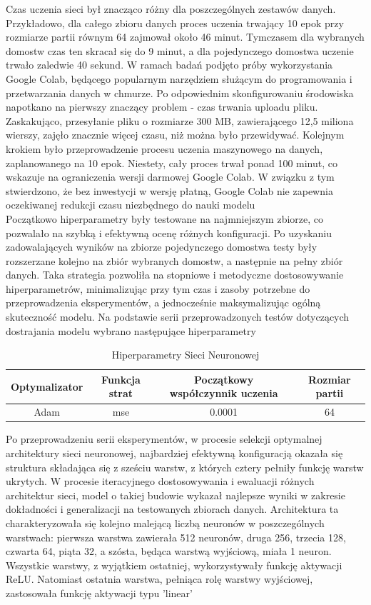 \documentclass[a4paper,twoside,12pt]{book}
\begin{document}
Czas uczenia sieci był znacząco różny dla poszczególnych zestawów danych. Przykładowo, dla całego zbioru danych proces uczenia trwający 10 epok przy rozmiarze partii równym 64 zajmował około 46 minut. Tymczasem dla wybranych domostw czas ten skracał się do 9 minut, a dla pojedynczego domostwa uczenie trwało zaledwie 40 sekund. W ramach badań podjęto próby wykorzystania Google Colab, będącego popularnym narzędziem służącym do programowania i przetwarzania danych w chmurze. Po odpowiednim skonfigurowaniu środowiska napotkano na pierwszy znaczący problem - czas trwania uploadu pliku. Zaskakująco, przesyłanie pliku o rozmiarze 300 MB, zawierającego 12,5 miliona wierszy, zajęło znacznie więcej czasu, niż można było przewidywać. Kolejnym krokiem było przeprowadzenie procesu uczenia maszynowego na danych, zaplanowanego na 10 epok. Niestety, cały proces trwał ponad 100 minut, co wskazuje na ograniczenia wersji darmowej Google Colab. W związku z tym stwierdzono, że bez inwestycji w wersję płatną, Google Colab nie zapewnia oczekiwanej redukcji czasu niezbędnego do nauki modelu\\

Początkowo hiperparametry były testowane na najmniejszym zbiorze, co pozwalało na szybką i efektywną ocenę różnych konfiguracji. Po uzyskaniu zadowalających wyników na zbiorze pojedynczego domostwa testy były rozszerzane kolejno na zbiór wybranych domostw, a następnie na pełny zbiór danych. Taka strategia pozwoliła na stopniowe i metodyczne dostosowywanie hiperparametrów, minimalizując przy tym czas i zasoby potrzebne do przeprowadzenia eksperymentów, a jednocześnie maksymalizując ogólną skuteczność modelu. Na podstawie serii przeprowadzonych testów dotyczących dostrajania modelu wybrano następujące hiperparametry
\begin{table}[!h]
  \centering
  \caption{Hiperparametry Sieci Neuronowej}
  \begin{tabular}{|c|c|c|c|}
    \hline
    Optymalizator & Funkcja strat & Początkowy współczynnik uczenia & Rozmiar partii \\ \hline
    Adam          & mse           & 0.0001                          & 64             \\ \hline
  \end{tabular}
\end{table}

Po przeprowadzeniu serii eksperymentów, w procesie selekcji optymalnej architektury sieci neuronowej, najbardziej efektywną konfiguracją okazała się struktura składająca się z sześciu warstw, z których cztery pełniły funkcję warstw ukrytych. W procesie iteracyjnego dostosowywania i ewaluacji różnych architektur sieci, model o takiej budowie wykazał najlepsze wyniki w zakresie dokładności i generalizacji na testowanych zbiorach danych. Architektura ta charakteryzowała się kolejno malejącą liczbą neuronów w poszczególnych warstwach: pierwsza warstwa zawierała 512 neuronów, druga 256, trzecia 128, czwarta 64, piąta 32, a szósta, będąca warstwą wyjściową, miała 1 neuron. Wszystkie warstwy, z wyjątkiem ostatniej, wykorzystywały funkcję aktywacji ReLU. Natomiast ostatnia warstwa, pełniąca rolę warstwy wyjściowej, zastosowała funkcję aktywacji typu 'linear'
\end{document}
